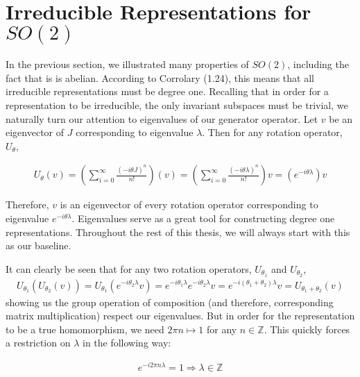 \documentclass[10pt]{ucthesis}
\newcommand{\Z}{\mathbb{Z}}
\begin{document}
\section{Irreducible Representations for $SO(2)$}

In the previous section, we illustrated many properties of $SO(2)$, including the fact that is is abelian. According to Corrolary (1.24), this means that all irreducible representations must be degree one. Recalling that in order for a representation to be irreducible, the only invariant subspaces must be trivial, we naturally turn our attention to eigenvalues of our generator operator. Let $v$ be an eigenvector of $J$ corresponding to eigenvalue $\lambda$. Then for any rotation operator, $U_\theta$,


\begin{equation}
	\begin{aligned}
		U_\theta (v) = \left(\sum_{i=0}^\infty \frac{(-i\theta J)^n}{n!}\right) (v) = \left(\sum_{i=0}^\infty \frac{(-i\theta \lambda)^n}{n!}\right)v = \left(e^{-i\theta \lambda}\right)v
	\end{aligned}
\end{equation}

Therefore, $v$ is an eigenvector of every rotation operator corresponding to eigenvalue $e^{-i\theta \lambda}$. Eigenvalues serve as a great tool for constructing degree one representations. Throughout the rest of this thesis, we will always start with this as our baseline.

It can clearly be seen that for any two rotation operators, $U_{\theta_1}$ and $U_{\theta_2}$,  
\begin{equation}
	\begin{aligned}
		U_{\theta_1}(U_{\theta_2}(v)) = U_{\theta_1}(e^{-i\theta_2 \lambda}v) = e^{-i\theta_1 \lambda}e^{-i\theta_2 \lambda}v = e^{-i(\theta_1 + \theta_2) \lambda}v = U_{\theta_1+\theta_2}(v) 
	\end{aligned}
\end{equation}
showing us the group operation of composition (and therefore, corresponding matrix multiplication) respect our eigenvalues. But in order for the representation to be a true homomorphism, we need $2\pi n \mapsto 1$ for any $n\in\Z$. This quickly forces a restriction on $\lambda$ in the following way:

\begin{equation}
	\begin{aligned}
		e^{-i2\pi n\lambda} = 1 \Rightarrow \lambda \in \Z
	\end{aligned}
\end{equation}
\end{document}
